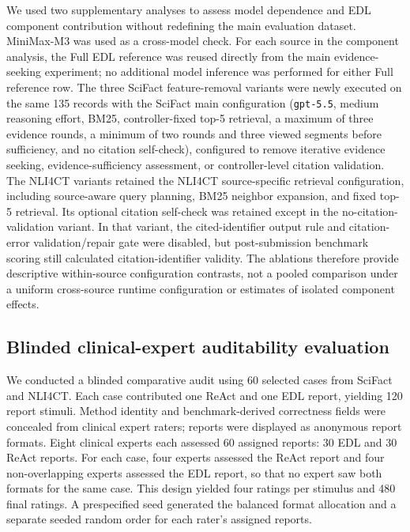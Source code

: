 \documentclass[11pt,a4paper]{article}
\begin{document}
We used two supplementary analyses to assess model dependence and EDL component contribution without redefining the main evaluation dataset. MiniMax-M3 was used as a cross-model check. For each source in the component analysis, the Full EDL reference was reused directly from the main evidence-seeking experiment; no additional model inference was performed for either Full reference row. The three SciFact feature-removal variants were newly executed on the same 135 records with the SciFact main configuration (\texttt{gpt-5.5}, medium reasoning effort, BM25, controller-fixed top-5 retrieval, a maximum of three evidence rounds, a minimum of two rounds and three viewed segments before sufficiency, and no citation self-check), configured to remove iterative evidence seeking, evidence-sufficiency assessment, or controller-level citation validation. The NLI4CT variants retained the NLI4CT source-specific retrieval configuration, including source-aware query planning, BM25 neighbor expansion, and fixed top-5 retrieval. Its optional citation self-check was retained except in the no-citation-validation variant. In that variant, the cited-identifier output rule and citation-error validation/repair gate were disabled, but post-submission benchmark scoring still calculated citation-identifier validity. The ablations therefore provide descriptive within-source configuration contrasts, not a pooled comparison under a uniform cross-source runtime configuration or estimates of isolated component effects.

\subsection{Blinded clinical-expert auditability evaluation}

We conducted a blinded comparative audit using 60 selected cases from SciFact and NLI4CT. Each case contributed one ReAct and one EDL report, yielding 120 report stimuli. Method identity and benchmark-derived correctness fields were concealed from clinical expert raters; reports were displayed as anonymous report formats. Eight clinical experts each assessed 60 assigned reports: 30 EDL and 30 ReAct reports. For each case, four experts assessed the ReAct report and four non-overlapping experts assessed the EDL report, so that no expert saw both formats for the same case. This design yielded four ratings per stimulus and 480 final ratings. A prespecified seed generated the balanced format allocation and a separate seeded random order for each rater's assigned reports.
\end{document}
